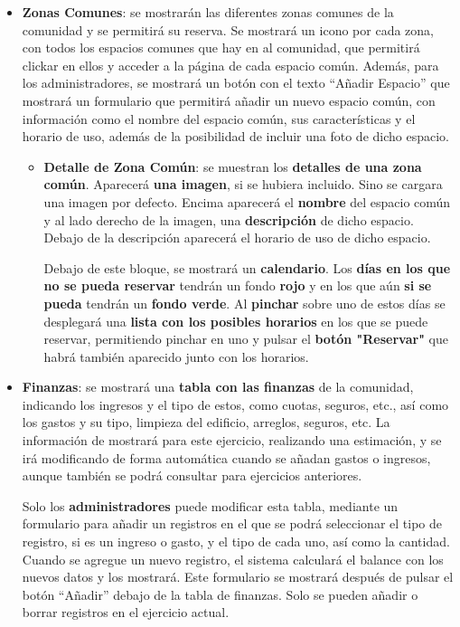 \begin{appendices}
\begin{itemize}
\begin{itemize}
\begin{itemize}
			\item \textbf{Zonas Comunes}: se mostrarán las diferentes zonas comunes de la comunidad y se permitirá su reserva. Se mostrará un icono por cada zona, con todos los espacios comunes que hay en al comunidad, que permitirá clickar en ellos y acceder a la página de cada espacio común. Además, para los administradores, se mostrará un botón con el texto ``Añadir Espacio'' que mostrará un formulario que permitirá añadir un nuevo espacio común, con información como el nombre del espacio común, sus características y el horario de uso, además de la posibilidad de incluir una foto de dicho espacio.
			
			\begin{itemize}
				\item \textbf{Detalle de Zona Común}: se muestran los \textbf{detalles de una zona común}. Aparecerá \textbf{una imagen}, si se hubiera incluido. Sino se cargara una imagen por defecto. Encima aparecerá el \textbf{nombre} del espacio común y al lado derecho de la imagen, una \textbf{descripción} de dicho espacio. Debajo de la descripción aparecerá el horario de uso de dicho espacio.
				
				Debajo de este bloque, se mostrará un \textbf{calendario}. Los \textbf{días en los que no se pueda reservar} tendrán un fondo \textbf{rojo} y en los que aún \textbf{si se pueda} tendrán un \textbf{fondo verde}. Al \textbf{pinchar} sobre uno de estos días se desplegará una \textbf{lista con los posibles horarios} en los que se puede reservar, permitiendo pinchar en uno y pulsar el \textbf{botón "Reservar"} que habrá también aparecido junto con los horarios.
			\end{itemize}
			
			\item \textbf{Finanzas}: se mostrará una \textbf{tabla con las finanzas} de la comunidad, indicando los ingresos y el tipo de estos, como cuotas, seguros, etc., así como los gastos y su tipo, limpieza del edificio, arreglos, seguros, etc. La información de mostrará para este ejercicio, realizando una estimación, y se irá modificando de forma automática cuando se añadan gastos o ingresos, aunque también se podrá consultar para ejercicios anteriores. 
			
			Solo los \textbf{administradores} puede modificar esta tabla, mediante un formulario para añadir un registros en el que se podrá seleccionar el tipo de registro, si es un ingreso o gasto, y el tipo de cada uno, así como la cantidad. Cuando se agregue un nuevo registro, el sistema calculará el balance con los nuevos datos y los mostrará. Este formulario se mostrará después de pulsar el botón ``Añadir'' debajo de la tabla de finanzas. Solo se pueden añadir o borrar registros en el ejercicio actual.
			

\end{itemize}
\end{itemize}
\end{itemize}
\end{appendices}
